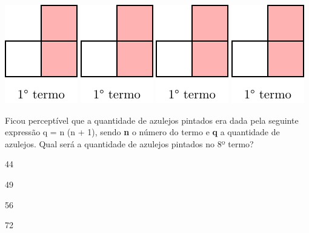 \includegraphics[page=1,scale=.85]{./tikz/048.pdf}\quad
\includegraphics[page=2,scale=.85]{./tikz/048.pdf}\quad
\includegraphics[page=3,scale=.85]{./tikz/048.pdf}\quad
\includegraphics[page=4,scale=.85]{./tikz/048.pdf}

Ficou perceptível que a quantidade de azulejos pintados era dada pela
seguinte expressão q = n \cdot (n + 1), sendo \textbf{n} o número do termo e
\textbf{q} a quantidade de azulejos. Qual será a quantidade de azulejos
pintados no 8º termo?

\begin{multicols}{2}
\begin{escolha}

\item
  44
\item
  49
\item
  56
\item
  72
\end{escolha}
\end{multicols}

